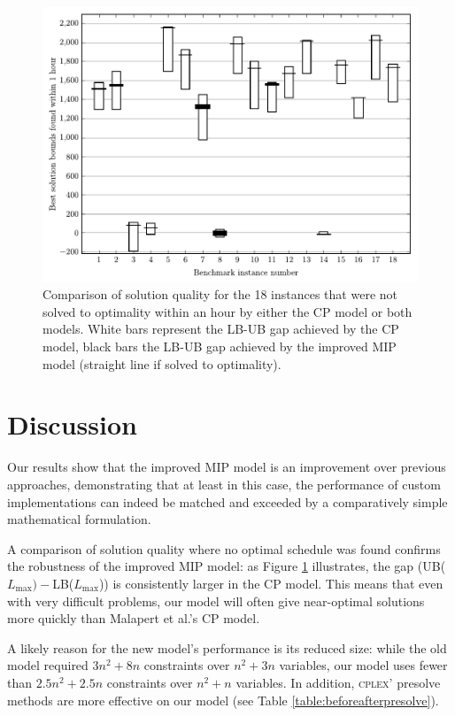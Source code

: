 \documentclass[oribibl]{llncs}
\def\Lmax{{L_{\mathrm{max}}}}
\begin{document}
\begin{figure}[h]
\centering
\includegraphics[height=0.45\textheight]{gapcomp.pdf}
\caption{Comparison of solution quality for the 18 instances that were not
solved to optimality within an hour by either the CP model or both models. White bars represent
the LB-UB gap achieved by the CP model, black bars the LB-UB gap achieved by the
improved MIP model (straight line if solved to optimality).}
\label{fig:gapcomp}
\end{figure}

\section{Discussion}
\label{sec:discussion}
Our results show that the improved MIP model is an improvement over previous
approaches, demonstrating that at least in this case, the performance
of custom implementations can indeed be matched and exceeded by
a comparatively simple mathematical formulation.

A comparison of solution quality where no optimal schedule was
found confirms the robustness of the improved MIP model: as Figure
\ref{fig:gapcomp} illustrates, the gap (UB($\Lmax)-$LB($\Lmax$)) is
consistently larger in the CP model. This means that even with very difficult
problems, our model will often give near-optimal solutions more quickly
than Malapert et al.'s CP model.

A likely reason for the new model's performance is its reduced size: while the
old model required $3n^2 + 8n$ constraints over $n^2 + 3n$ variables, our model
uses fewer than $2.5n^2 + 2.5n$ constraints over $n^2 + n$ variables. In
addition, \textsc{cplex}' presolve methods are more effective on our model (see
Table \ref{table:beforeafterpresolve}).
\end{document}
